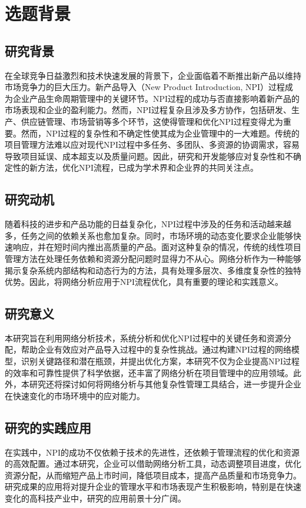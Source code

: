 \chapter{选题背景}

\section{研究背景}
在全球竞争日益激烈和技术快速发展的背景下，企业面临着不断推出新产品以维持市场竞争力的巨大压力。新产品导入（New Product Introduction, NPI）过程成为企业产品生命周期管理中的关键环节。NPI过程的成功与否直接影响着新产品的市场表现和企业的盈利能力。然而，NPI过程复杂且涉及多方协作，包括研发、生产、供应链管理、市场营销等多个环节，这使得管理和优化NPI过程变得尤为重要\cite{Cooper2001Winning}。然而，NPI过程的复杂性和不确定性使其成为企业管理中的一大难题。传统的项目管理方法难以应对现代NPI过程中多任务、多团队、多资源的协调需求，容易导致项目延误、成本超支以及质量问题。因此，研究和开发能够应对复杂性和不确定性的新方法，优化NPI流程，已成为学术界和企业界的共同关注点。

\section{研究动机}
随着科技的进步和产品功能的日益复杂化，NPI过程中涉及的任务和活动越来越多，任务之间的依赖关系也愈加复杂。同时，市场环境的动态变化要求企业能够快速响应，并在短时间内推出高质量的产品。面对这种复杂的情况，传统的线性项目管理方法在处理任务依赖和资源分配问题时显得力不从心\cite{Kerzner2017Project}。网络分析作为一种能够揭示复杂系统内部结构和动态行为的方法，具有处理多层次、多维度复杂性的独特优势。因此，将网络分析应用于NPI流程优化，具有重要的理论和实践意义。

\section{研究意义}
本研究旨在利用网络分析技术，系统分析和优化NPI过程中的关键任务和资源分配，帮助企业有效应对产品导入过程中的复杂性挑战。通过构建NPI过程的网络模型，识别关键路径和潜在瓶颈，并提出优化方案，本研究不仅为企业提高NPI过程的效率和可靠性提供了科学依据，还丰富了网络分析在项目管理中的应用领域\cite{Newman2003Structure, Barabasi2002Linked}。此外，本研究还将探讨如何将网络分析与其他复杂性管理工具结合，进一步提升企业在快速变化的市场环境中的应对能力。

\section{研究的实践应用}
在实践中，NPI的成功不仅依赖于技术的先进性，还依赖于管理流程的优化和资源的高效配置。通过本研究，企业可以借助网络分析工具，动态调整项目进度，优化资源分配，从而缩短产品上市时间，降低项目成本，提高产品质量和市场竞争力。研究成果的应用将对提升企业的管理水平和市场表现产生积极影响，特别是在快速变化的高科技产业中，研究的应用前景十分广阔。


